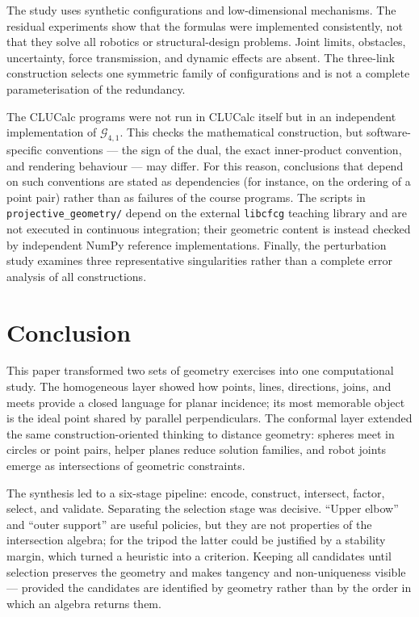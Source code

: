 \documentclass[11pt,a4paper]{article}
\theoremstyle{plain}
\theoremstyle{definition}
\theoremstyle{remark}
\newcommand{\GA}{\mathcal{G}_{4,1}}
\begin{document}
The study uses synthetic configurations and low-dimensional mechanisms. The
residual experiments show that the formulas were implemented consistently, not
that they solve all robotics or structural-design problems. Joint limits,
obstacles, uncertainty, force transmission, and dynamic effects are absent.
The three-link construction selects one symmetric family of configurations and
is not a complete parameterisation of the redundancy.

The CLUCalc programs were not run in CLUCalc itself but in an independent
implementation of $\GA$. This checks the mathematical construction, but
software-specific conventions --- the sign of the dual, the exact inner-product
convention, and rendering behaviour --- may differ. For this reason,
conclusions that depend on such conventions are stated as dependencies (for
instance, on the ordering of a point pair) rather than as failures of the
course programs. The scripts in \texttt{projective\_geometry/} depend on the
external \texttt{libcfcg} teaching library and are not executed in continuous
integration; their geometric content is instead checked by independent NumPy
reference implementations. Finally, the perturbation study examines three
representative singularities rather than a complete error analysis of all
constructions.

\section{Conclusion}\label{sec:conclusion}

This paper transformed two sets of geometry exercises into one computational
study. The homogeneous layer showed how points, lines, directions, joins, and
meets provide a closed language for planar incidence; its most memorable object
is the ideal point shared by parallel perpendiculars. The conformal layer
extended the same construction-oriented thinking to distance geometry: spheres
meet in circles or point pairs, helper planes reduce solution families, and
robot joints emerge as intersections of geometric constraints.

The synthesis led to a six-stage pipeline: encode, construct, intersect, factor,
select, and validate. Separating the selection stage was decisive. ``Upper
elbow'' and ``outer support'' are useful policies, but they are not properties of
the intersection algebra; for the tripod the latter could be justified by a
stability margin, which turned a heuristic into a criterion. Keeping all
candidates until selection preserves the geometry and makes tangency and
non-uniqueness visible --- provided the candidates are identified by geometry
rather than by the order in which an algebra returns them.
\end{document}
